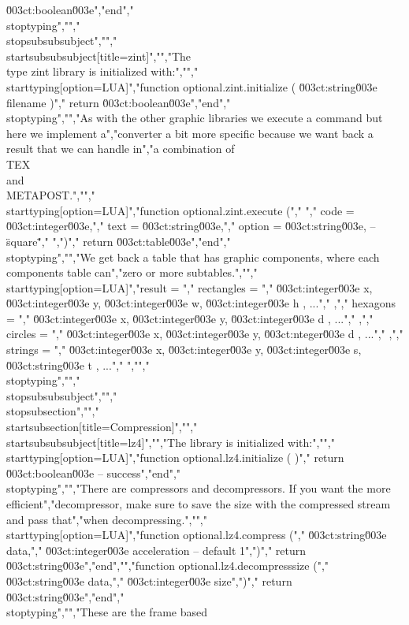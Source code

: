 \u003ct:boolean\u003e","end","\\stoptyping","","\\stopsubsubsubject","","\\startsubsubsubject[title=zint]","","The \\type {zint} library is initialized with:","","\\starttyping[option=LUA]","function optional.zint.initialize ( \u003ct:string\u003e filename )","    return \u003ct:boolean\u003e","end","\\stoptyping","","As with the other graphic libraries we execute a command but here we implement a","converter a bit more specific because we want back a result that we can handle in","a combination of \\TEX\\ and \\METAPOST.","","\\starttyping[option=LUA]","function optional.zint.execute (","    {","        code   = \u003ct:integer\u003e,","        text   = \u003ct:string\u003e,","        option = \u003ct:string\u003e, -- \"square\"","    }",")","    return \u003ct:table\u003e","end","\\stoptyping","","We get back a table that has graphic components, where each components table can","zero or more subtables.","","\\starttyping[option=LUA]","result = {","    rectangles = {","        { \u003ct:integer\u003e x, \u003ct:integer\u003e y, \u003ct:integer\u003e w, \u003ct:integer\u003e h }, ...","    },","    hexagons = {","        { \u003ct:integer\u003e x, \u003ct:integer\u003e y, \u003ct:integer\u003e d }, ...","    },","    circles = {","        { \u003ct:integer\u003e x, \u003ct:integer\u003e y, \u003ct:nteger\u003e d }, ...","    },","    strings = {","        { \u003ct:integer\u003e x, \u003ct:integer\u003e y, \u003ct:integer\u003e s, \u003ct:string\u003e t }, ...","    }","}","\\stoptyping","","\\stopsubsubsubject","","\\stopsubsection","","\\startsubsection[title=Compression]","","\\startsubsubsubject[title=lz4]","","The library is initialized with:","","\\starttyping[option=LUA]","function optional.lz4.initialize ( )","    return \u003ct:boolean\u003e -- success","end","\\stoptyping","","There are compressors and decompressors. If you want the more efficient","decompressor, make sure to save the size with the compressed stream and pass that","when decompressing.","","\\starttyping[option=LUA]","function optional.lz4.compress (","    \u003ct:string\u003e  data,","    \u003ct:integer\u003e acceleration -- default 1",")","    return \u003ct:string\u003e","end","","function optional.lz4.decompresssize (","    \u003ct:string\u003e  data,","    \u003ct:integer\u003e size",")","    return \u003ct:string\u003e","end","\\stoptyping","","These are the frame based 